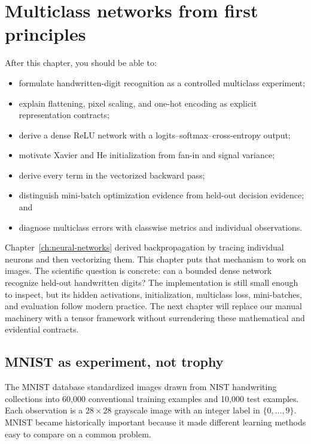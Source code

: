 \chapter{Multiclass networks from first principles}
\label{ch:mnist-mlp}

\begin{learningobjectives}
After this chapter, you should be able to:
\begin{itemize}
  \item formulate handwritten-digit recognition as a controlled multiclass
  experiment;
  \item explain flattening, pixel scaling, and one-hot encoding as explicit
  representation contracts;
  \item derive a dense ReLU network with a logits--softmax--cross-entropy
  output;
  \item motivate Xavier and He initialization from fan-in and signal variance;
  \item derive every term in the vectorized backward pass;
  \item distinguish mini-batch optimization evidence from held-out decision
  evidence; and
  \item diagnose multiclass errors with classwise metrics and individual
  observations.
\end{itemize}
\end{learningobjectives}

\begin{chapterconnection}
Chapter~\ref{ch:neural-networks} derived backpropagation by tracing individual
neurons and then vectorizing them. This chapter puts that mechanism to work on
images. The scientific question is concrete: can a bounded dense network
recognize held-out handwritten digits? The implementation is still small
enough to inspect, but its hidden activations, initialization, multiclass loss,
mini-batches, and evaluation follow modern practice. The next chapter will
replace our manual machinery with a tensor framework without surrendering
these mathematical and evidential contracts.
\end{chapterconnection}

\section{MNIST as experiment, not trophy}

The MNIST database standardized images drawn from NIST handwriting
collections into 60,000 conventional training examples and 10,000 test
examples. Each observation is a $28\times28$ grayscale image with an integer
label in $\{0,\ldots,9\}$. MNIST became historically important because it made
different learning methods easy to compare on a common problem.

